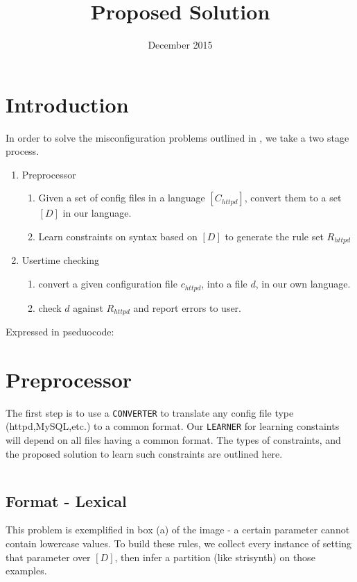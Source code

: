 \documentclass{article}
\title{Proposed Solution}
\author{}
\date{December 2015}
\begin{document}
\maketitle

\section{Introduction}
In order to solve the misconfiguration problems outlined in \cite{yin2011}, we take a two stage process.

\begin{enumerate}
  \item Preprocessor
  \begin{enumerate}
    \item Given a set of config files in a language $[C_{httpd}]$, convert them to a set $[D]$ in our language.
    \item Learn constraints on syntax based on $[D]$ to generate the rule set $R_{httpd}$
  \end{enumerate}
  \item Usertime checking
  \begin{enumerate}
    \item convert a given configuration file $c_{httpd}$, into a file $d$, in our own language.
    \item check $d$ against $R_{httpd}$ and report errors to user.
  \end{enumerate}
\end{enumerate}

Expressed in pseduocode:



\section{Preprocessor}
The first step is to use a \texttt{CONVERTER} to translate any config file type (httpd,MySQL,etc.) to a common format. 
Our \texttt{LEARNER} for learning constaints will depend on all files having a common format. 
The types of constraints, and the proposed solution to learn such constraints are outlined here.

\begin{lstlisting}
\end{lstlisting}



\subsection{Format - Lexical}
This problem is exemplified in box (a) of the image - a certain parameter cannot contain lowercase values.
To build these rules, we collect every instance of setting that parameter over $[D]$, then infer a partition (like strisynth) on those examples.
\end{document}
